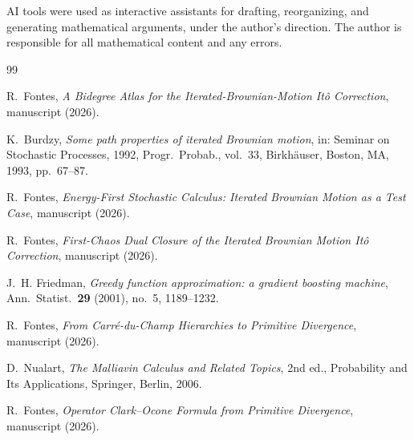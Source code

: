 \documentclass[11pt,reqno]{amsart}
\theoremstyle{plain}
\theoremstyle{definition}
\theoremstyle{remark}
\begin{document}
AI tools were used as interactive assistants for drafting,
reorganizing, and generating mathematical arguments, under the
author's direction. The author is responsible for all
mathematical content and any errors.

\begin{thebibliography}{99}

R.~Fontes, \emph{A Bidegree Atlas for the Iterated-Brownian-Motion
  It\^o Correction}, manuscript (2026).

K.~Burdzy, \emph{Some path properties of iterated Brownian motion},
  in: Seminar on Stochastic Processes, 1992, Progr.\ Probab.,
  vol.~33, Birkh\"auser, Boston, MA, 1993, pp.~67--87.

R.~Fontes, \emph{Energy-First Stochastic Calculus: Iterated
  Brownian Motion as a Test Case}, manuscript (2026).

R.~Fontes, \emph{First-Chaos Dual Closure of the Iterated
  Brownian Motion It\^o Correction}, manuscript (2026).

J.~H. Friedman, \emph{Greedy function approximation: a gradient
  boosting machine}, Ann.\ Statist.\ \textbf{29} (2001),
  no.~5, 1189--1232.

R.~Fontes, \emph{From Carr\'e-du-Champ Hierarchies to Primitive
  Divergence}, manuscript (2026).

D.~Nualart, \emph{The Malliavin Calculus and Related Topics},
  2nd ed., Probability and Its Applications, Springer, Berlin,
  2006.

R.~Fontes, \emph{Operator Clark--Ocone Formula from Primitive
  Divergence}, manuscript (2026).

\end{thebibliography}
\end{document}
